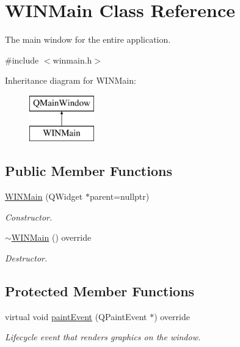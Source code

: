 \hypertarget{class_w_i_n_main}{}\section{W\+I\+N\+Main Class Reference}
\label{class_w_i_n_main}


The main window for the entire application.  




{\ttfamily \#include $<$winmain.\+h$>$}

Inheritance diagram for W\+I\+N\+Main\+:\begin{figure}[H]
\begin{center}
\leavevmode
\includegraphics[height=2.000000cm]{class_w_i_n_main}
\end{center}
\end{figure}
\subsection*{Public Member Functions}
\begin{DoxyCompactItemize}
\item 
\mbox{\hyperlink{class_w_i_n_main_a6bc8d511a5fc73cb8378e1baefb0b2bd}{W\+I\+N\+Main}} (Q\+Widget $\ast$parent=nullptr)
\begin{DoxyCompactList}\small\item\em Constructor. \end{DoxyCompactList}\item 
\mbox{\hyperlink{class_w_i_n_main_a5e1564b7f926df4af04c224e8bb3bcb2}{$\sim$\+W\+I\+N\+Main}} () override
\begin{DoxyCompactList}\small\item\em Destructor. \end{DoxyCompactList}\end{DoxyCompactItemize}
\subsection*{Protected Member Functions}
\begin{DoxyCompactItemize}
\item 
virtual void \mbox{\hyperlink{class_w_i_n_main_a906d327c99d10704adff07b81422052e}{paint\+Event}} (Q\+Paint\+Event $\ast$) override
\begin{DoxyCompactList}\small\item\em Lifecycle event that renders graphics on the window. \end{DoxyCompactList}\end{DoxyCompactItemize}


